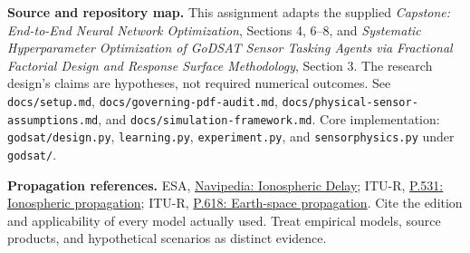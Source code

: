 \documentclass[11pt,letterpaper]{article}
\newcommand{\code}[1]{\texttt{\small #1}}
\begin{document}
\textbf{Source and repository map.} This assignment adapts the supplied \emph{Capstone: End-to-End Neural Network Optimization}, Sections 4, 6--8, and \emph{Systematic Hyperparameter Optimization of GoDSAT Sensor Tasking Agents via Fractional Factorial Design and Response Surface Methodology}, Section 3. The research design's claims are hypotheses, not required numerical outcomes. See \code{docs/setup.md}, \code{docs/governing-pdf-audit.md}, \code{docs/physical-sensor-assumptions.md}, and \code{docs/simulation-framework.md}. Core implementation: \code{godsat/design.py}, \code{learning.py}, \code{experiment.py}, and \code{sensorphysics.py} under \code{godsat/}.

\textbf{Propagation references.} ESA, \href{https://gssc.esa.int/navipedia/index.php/Ionospheric_Delay}{Navipedia: Ionospheric Delay}; ITU-R, \href{https://www.itu.int/rec/R-REC-P.531/en}{P.531: Ionospheric propagation}; ITU-R, \href{https://www.itu.int/rec/R-REC-P.618/en}{P.618: Earth-space propagation}. Cite the edition and applicability of every model actually used. Treat empirical models, source products, and hypothetical scenarios as distinct evidence.
\end{document}
